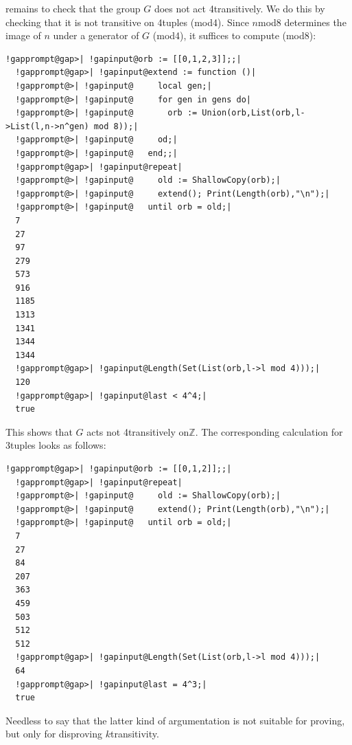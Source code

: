 \documentclass[a4paper,11pt]{report}
\begin{document}
{{remains to check that the group $G$ does not act 4\texttt{}transitively. We do this by checking that it
is not transitive on 4\texttt{}tuples (mod{\nobreakspace}4). Since $n${\nobreakspace}mod{\nobreakspace}8 determines the image of $n$ under a generator of $G$ (mod{\nobreakspace}4), it suffices to compute (mod{\nobreakspace}8): 
\begin{Verbatim}[commandchars=!@|,fontsize=\small,frame=single,label=Example]
  !gapprompt@gap>| !gapinput@orb := [[0,1,2,3]];;|
  !gapprompt@gap>| !gapinput@extend := function ()|
  !gapprompt@>| !gapinput@     local gen;|
  !gapprompt@>| !gapinput@     for gen in gens do|
  !gapprompt@>| !gapinput@       orb := Union(orb,List(orb,l->List(l,n->n^gen) mod 8));|
  !gapprompt@>| !gapinput@     od;|
  !gapprompt@>| !gapinput@   end;;|
  !gapprompt@gap>| !gapinput@repeat|
  !gapprompt@>| !gapinput@     old := ShallowCopy(orb);|
  !gapprompt@>| !gapinput@     extend(); Print(Length(orb),"\n");|
  !gapprompt@>| !gapinput@   until orb = old;|
  7
  27
  97
  279
  573
  916
  1185
  1313
  1341
  1344
  1344
  !gapprompt@gap>| !gapinput@Length(Set(List(orb,l->l mod 4)));|
  120
  !gapprompt@gap>| !gapinput@last < 4^4;|
  true
\end{Verbatim}
 This shows that $G$ acts not 4\texttt{}transitively
on{\nobreakspace}{\ensuremath{\mathbb Z}}. The corresponding calculation for
3\texttt{}tuples looks as follows: 
\begin{Verbatim}[commandchars=!@|,fontsize=\small,frame=single,label=Example]
  !gapprompt@gap>| !gapinput@orb := [[0,1,2]];;|
  !gapprompt@gap>| !gapinput@repeat|
  !gapprompt@>| !gapinput@     old := ShallowCopy(orb);|
  !gapprompt@>| !gapinput@     extend(); Print(Length(orb),"\n");|
  !gapprompt@>| !gapinput@   until orb = old;|
  7
  27
  84
  207
  363
  459
  503
  512
  512
  !gapprompt@gap>| !gapinput@Length(Set(List(orb,l->l mod 4)));|
  64
  !gapprompt@gap>| !gapinput@last = 4^3;|
  true
\end{Verbatim}
 Needless to say that the latter kind of argumentation is not suitable for
proving, but only for disproving $k$\texttt{}transitivity. }

  
}
\end{document}
